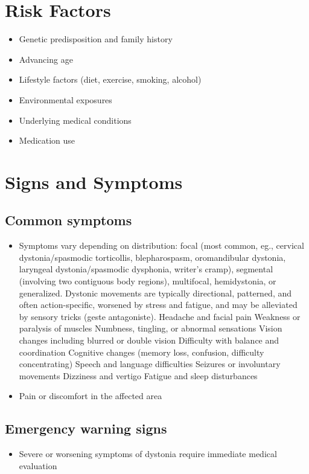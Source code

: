 \section{Risk Factors}
\begin{itemize}[noitemsep]
  \item Genetic predisposition and family history
  \item Advancing age
  \item Lifestyle factors (diet, exercise, smoking, alcohol)
  \item Environmental exposures
  \item Underlying medical conditions
  \item Medication use
\end{itemize}
\section{Signs and Symptoms}

\subsection{Common symptoms}
\begin{itemize}[noitemsep]
  \item Symptoms vary depending on distribution: focal (most common, eg., cervical dystonia/spasmodic torticollis, blepharospasm, oromandibular dystonia, laryngeal dystonia/spasmodic dysphonia, writer's cramp), segmental (involving two contiguous body regions), multifocal, hemidystonia, or generalized. Dystonic movements are typically directional, patterned, and often action-specific, worsened by stress and fatigue, and may be alleviated by sensory tricks (geste antagoniste). Headache and facial pain Weakness or paralysis of muscles Numbness, tingling, or abnormal sensations Vision changes including blurred or double vision Difficulty with balance and coordination Cognitive changes (memory loss, confusion, difficulty concentrating) Speech and language difficulties Seizures or involuntary movements Dizziness and vertigo Fatigue and sleep disturbances
  \item Pain or discomfort in the affected area
  \end{itemize}

\subsection{Emergency warning signs}
\begin{itemize}[noitemsep]
  \item Severe or worsening symptoms of dystonia require immediate medical evaluation
\end{itemize}
